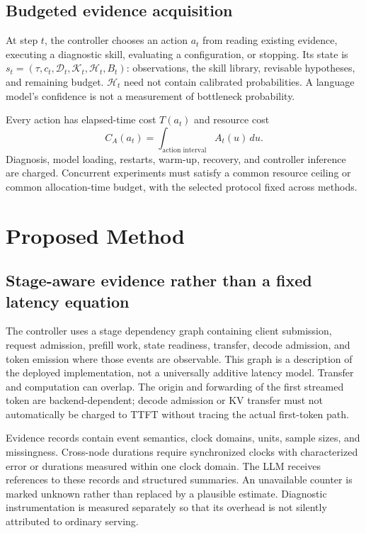 \documentclass[preprint,12pt]{elsarticle}
\begin{document}
\subsection{Budgeted evidence acquisition}
At step $t$, the controller chooses an action $a_t$ from reading existing evidence, executing a diagnostic skill, evaluating a configuration, or stopping. Its state is $s_t=(\tau,c_t,\mathcal{D}_t,\mathcal{K}_t,\mathcal{H}_t,B_t)$: observations, the skill library, revisable hypotheses, and remaining budget. $\mathcal{H}_t$ need not contain calibrated probabilities. A language model's confidence is not a measurement of bottleneck probability.

Every action has elapsed-time cost $T(a_t)$ and resource cost
\begin{equation}
 C_A(a_t)=\int_{\text{action interval}} A_t(u)\,du.
\end{equation}
Diagnosis, model loading, restarts, warm-up, recovery, and controller inference are charged. Concurrent experiments must satisfy a common resource ceiling or common allocation-time budget, with the selected protocol fixed across methods.

\section{Proposed Method}
\subsection{Stage-aware evidence rather than a fixed latency equation}
The controller uses a stage dependency graph containing client submission, request admission, prefill work, state readiness, transfer, decode admission, and token emission where those events are observable. This graph is a description of the deployed implementation, not a universally additive latency model. Transfer and computation can overlap. The origin and forwarding of the first streamed token are backend-dependent; decode admission or KV transfer must not automatically be charged to TTFT without tracing the actual first-token path.

Evidence records contain event semantics, clock domains, units, sample sizes, and missingness. Cross-node durations require synchronized clocks with characterized error or durations measured within one clock domain. The LLM receives references to these records and structured summaries. An unavailable counter is marked unknown rather than replaced by a plausible estimate. Diagnostic instrumentation is measured separately so that its overhead is not silently attributed to ordinary serving.
\end{document}
